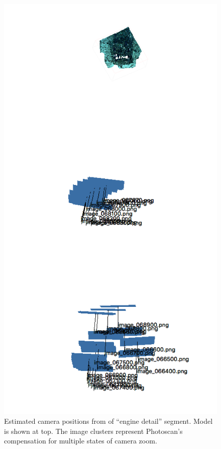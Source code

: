 \documentclass[letterpaper,12pt]{article}
\begin{document}
\begin{figure}
    \centering
    \includegraphics[height=0.9\textheight]{images/engine_detail_photoscan_trajectory.png}
    \caption{Estimated camera positions from of ``engine detail'' segment.  Model is shown at top.  The image clusters represent Photoscan's compensation for multiple states of camera zoom.}
    \label{fig:ex1605l3_dive22_engine_detail_photoscan_trajectory}
\end{figure}
\end{document}
